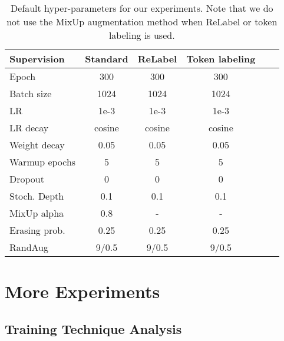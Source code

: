 \documentclass{article}
\begin{document}
\begin{table}[h]
  \centering
  \small
  \setlength\tabcolsep{1.2mm}
  \renewcommand\arraystretch{1}
  \caption{Default hyper-parameters for our experiments. Note that we do not use the MixUp augmentation method
  when ReLabel or token labeling is used.}
  \label{tab:hyper_p}
  \begin{tabular}{lccccc} \toprule[0.5pt]
    Supervision & Standard & ReLabel & Token labeling \\ \midrule[0.5pt] \midrule[0.5pt]
    Epoch & 300 & 300 & 300\\ \midrule[0.5pt]
    Batch size & 1024 & 1024 & 1024\\
    LR & 1e-3  &  1e-3  &  1e-3 \\
    LR decay & cosine & cosine & cosine\\
    Weight decay & 0.05& 0.05& 0.05\\
    Warmup epochs& 5 & 5 & 5 \\\midrule[0.5pt]
    Dropout & 0 & 0& 0\\
    Stoch. Depth & 0.1 & 0.1 & 0.1 \\
    MixUp alpha & 0.8 & - & -\\
    Erasing prob. & 0.25 & 0.25 &0.25\\
    RandAug & 9/0.5 & 9/0.5 & 9/0.5\\
    \bottomrule[0.5pt]
  \end{tabular}
\end{table}

\section{More Experiments}


\subsection{Training Technique Analysis} \label{sec:analysis}
\end{document}
